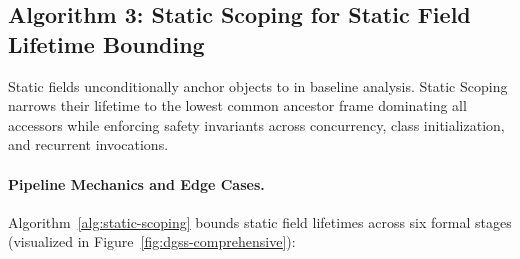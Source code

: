 \documentclass[12pt,a4paper]{article}
\newcommand{\GLOBAL}{\text{GLOBAL}}
\begin{document}
\subsection{Algorithm 3: Static Scoping for Static Field Lifetime Bounding}

Static fields unconditionally anchor objects to \GLOBAL{} in baseline analysis. Static Scoping narrows their lifetime to the lowest common ancestor frame dominating all accessors while enforcing safety invariants across concurrency, class initialization, and recurrent invocations.

\paragraph{Pipeline Mechanics and Edge Cases.}
Algorithm~\ref{alg:static-scoping} bounds static field lifetimes across six formal stages (visualized in Figure~\ref{fig:dgss-comprehensive}):
\end{document}
